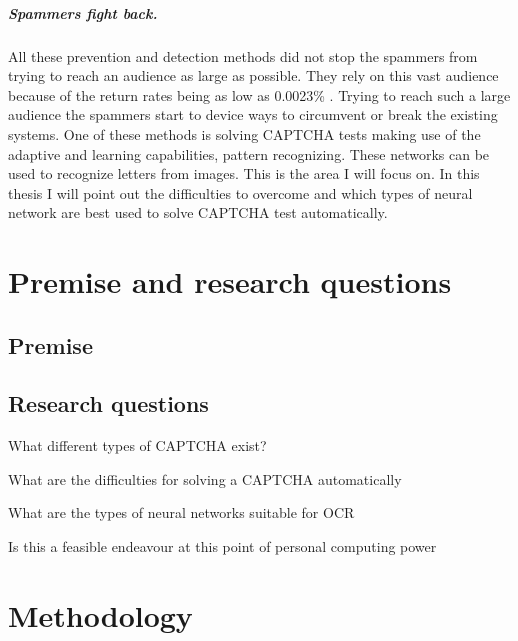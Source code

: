 \documentclass[pdftex,a4paper,12pt,twoside]{report}
\begin{document}
\paragraph{Spammers fight back.}
All these prevention and detection methods did not stop the spammers from trying to reach an audience as large  as possible. They rely on this vast audience because of the return rates being as low as 0.0023\% \citep{Cobb2003}. Trying to reach such a large audience the spammers start to device ways to circumvent or break the existing systems. One of these methods is solving CAPTCHA tests making use of the adaptive and learning capabilities, pattern recognizing. These networks can be used to recognize letters from images.
This is the area I will focus on. In this thesis I will point out the difficulties to overcome and which types of neural network are best used to solve CAPTCHA test automatically.






\chapter{Premise and research questions}
\label{ch:Premise}

\section{Premise}
\label{sec:Premise}


\section{Research questions}
\label{sec:researquestions}

What different types of CAPTCHA exist?

What are the difficulties for solving a CAPTCHA automatically

What are the types of neural networks suitable for OCR

Is this a feasible endeavour at this point of personal computing power

\chapter{Methodology}
\label{ch:methodology}
\end{document}
